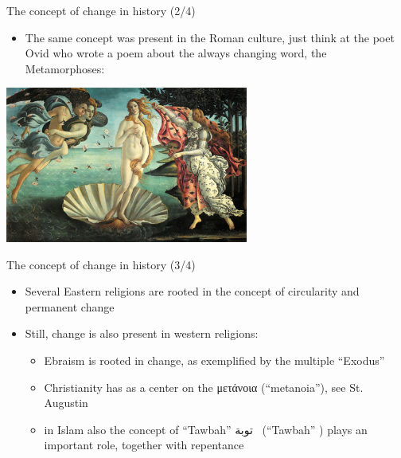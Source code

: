 \documentclass{beamer}
\begin{document}
\begin{frame}
{\centerline{The concept of change in history (2/4)}}
\begin{itemize}
\item The same concept was present in the Roman culture, just think at the poet Ovid who wrote a poem about the always changing word, the Metamorphoses:
\end{itemize} 

\begin{center}
 \includegraphics[width=8cm]{P2023.AIBCCSS.Change/LaNascitaDiVenere.jpg}
 
 \end{center}

\end{frame}

\begin{frame}
{\centerline{The concept of change in history (3/4)}}
 
\begin{itemize}
 \item Several Eastern religions are rooted in the concept of circularity and permanent change
 \item Still, change is also present in western religions:
\begin{itemize}
\item  Ebraism is rooted in change, as exemplified by the multiple ``Exodus''
\item  Christianity has as a center on the \foreignlanguage{greek}{μετάνοια} (``metanoia''), see St. Augustin
\item in Islam also the concept of  ``Tawbah'' \bgroup{}\selectfont توبة\egroup ~ (``Tawbah'' ) plays an important role, together with repentance
\end{itemize} 
\end{itemize} 

\end{frame}
\end{document}
